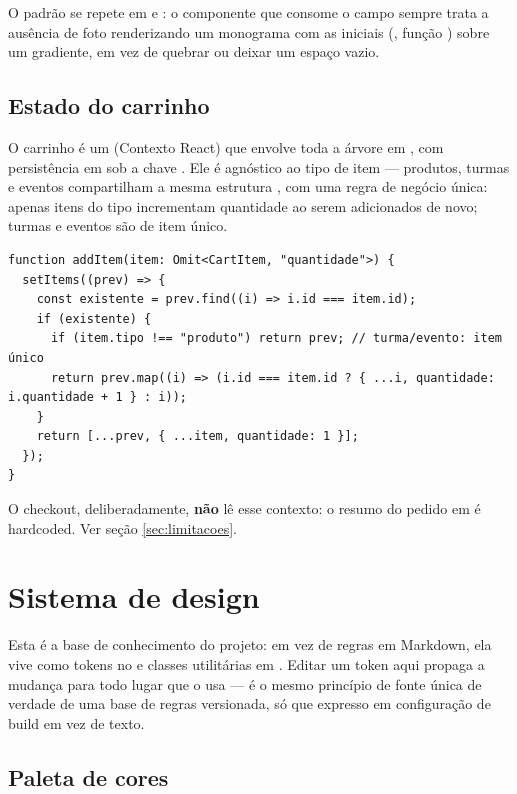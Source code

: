 O padrão  se repete em  e : o
componente que consome o campo sempre trata a ausência de foto renderizando um
monograma com as iniciais (, função ) sobre
um gradiente, em vez de quebrar ou deixar um espaço vazio.

\subsection{Estado do carrinho}

O carrinho é um  (Contexto React) que envolve toda a árvore em
, com persistência em  sob a chave
. Ele é agnóstico ao tipo de item --- produtos, turmas e
eventos compartilham a mesma estrutura , com uma regra de negócio
única: apenas itens do tipo  incrementam quantidade ao serem
adicionados de novo; turmas e eventos são de item único.

\begin{lstlisting}[style=tsx]
function addItem(item: Omit<CartItem, "quantidade">) {
  setItems((prev) => {
    const existente = prev.find((i) => i.id === item.id);
    if (existente) {
      if (item.tipo !== "produto") return prev; // turma/evento: item único
      return prev.map((i) => (i.id === item.id ? { ...i, quantidade: i.quantidade + 1 } : i));
    }
    return [...prev, { ...item, quantidade: 1 }];
  });
}
\end{lstlisting}

O checkout, deliberadamente, \textbf{não} lê esse contexto: o resumo do pedido
em  é hardcoded. Ver seção \ref{sec:limitacoes}.

\section{Sistema de design}
\label{sec:design}

Esta é a base de conhecimento do projeto: em vez de regras em Markdown, ela vive
como tokens no  e classes utilitárias em
. Editar um token aqui propaga a mudança para todo lugar que o
usa --- é o mesmo princípio de fonte única de verdade de uma base de regras
versionada, só que expresso em configuração de build em vez de texto.

\subsection{Paleta de cores}

